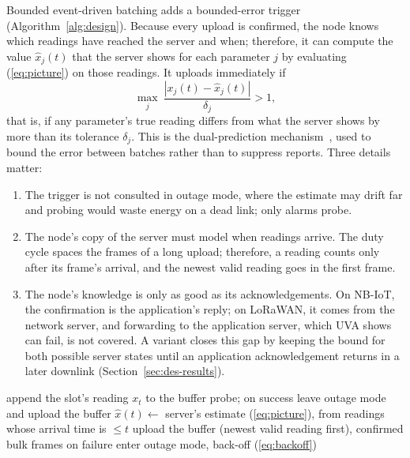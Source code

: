 Bounded event-driven batching adds a bounded-error trigger (Algorithm~\ref{alg:design}). Because every upload is confirmed, the node knows which readings have reached the server and when; therefore, it can compute the value $\hat{x}_j(t)$ that the server shows for each parameter $j$ by evaluating (\ref{eq:picture}) on those readings. It uploads immediately if
\begin{equation}
\max_{j}\ \frac{|x_j(t)-\hat{x}_j(t)|}{\delta_j}>1,
\label{eq:trigger}
\end{equation}
that is, if any parameter's true reading differs from what the server shows by more than its tolerance $\delta_j$. This is the dual-prediction mechanism~\cite{dias2016survey,santini2006adaptive}, used to bound the error between batches rather than to suppress reports. Three details matter:
\begin{enumerate}
\item The trigger is not consulted in outage mode, where the estimate may drift far and probing would waste energy on a dead link; only alarms probe.
\item The node's copy of the server must model when readings arrive. The duty cycle spaces the frames of a long upload; therefore, a reading counts only after its frame's arrival, and the newest valid reading goes in the first frame.
\item The node's knowledge is only as good as its acknowledgements. On NB-IoT, the confirmation is the application's reply; on LoRaWAN, it comes from the network server, and forwarding to the application server, which UVA shows can fail, is not covered. A variant closes this gap by keeping the bound for both possible server states until an application acknowledgement returns in a later downlink (Section~\ref{sec:des-results}).
\end{enumerate}

\begin{algorithm}[t]
\caption{Bounded event-driven batching: node, one slot}
\label{alg:design}
\small
\begin{algorithmic}[1]
\State append the slot's reading $x_t$ to the buffer
   \State probe; on success leave outage mode and upload the buffer \EndIf
  \State \Return
\EndIf
\State $\hat{x}(t) \gets$ server's estimate (\ref{eq:picture}), from readings whose arrival time is $\le t$
  \State upload the buffer (newest valid reading first), confirmed bulk frames
  \State on failure enter outage mode, back-off (\ref{eq:backoff})
\EndIf
\end{algorithmic}
\end{algorithm}

